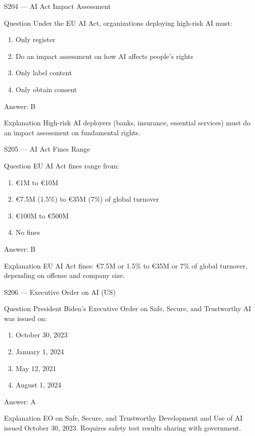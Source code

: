 \documentclass[aspectratio=169,8pt]{beamer}
\begin{document}
\begin{frame}{S204 --- AI Act Impact Assessment}
	\begin{block}{Question}
		Under the EU AI Act, organizations deploying high-risk AI must:
		\begin{enumerate}
			\item Only register
			\item Do an impact assessment on how AI affects people's rights
			\item Only label content
			\item Only obtain consent
		\end{enumerate}
	\end{block}
	\begin{exampleblock}{Answer: B}\end{exampleblock}
	\begin{block}{Explanation}
		High-risk AI deployers (banks, insurance, essential services) must do an impact assessment on fundamental rights.
	\end{block}
\end{frame}

\begin{frame}{S205 --- AI Act Fines Range}
	\begin{block}{Question}
		EU AI Act fines range from:
		\begin{enumerate}
			\item €1M to €10M
			\item €7.5M (1.5\%) to €35M (7\%) of global turnover
			\item €100M to €500M
			\item No fines
		\end{enumerate}
	\end{block}
	\begin{exampleblock}{Answer: B}\end{exampleblock}
	\begin{block}{Explanation}
		EU AI Act fines: €7.5M or 1.5\% to €35M or 7\% of global turnover, depending on offense and company size.
	\end{block}
\end{frame}

\begin{frame}{S206 --- Executive Order on AI (US)}
	\begin{block}{Question}
		President Biden's Executive Order on Safe, Secure, and Trustworthy AI was issued on:
		\begin{enumerate}
			\item October 30, 2023
			\item January 1, 2024
			\item May 12, 2021
			\item August 1, 2024
		\end{enumerate}
	\end{block}
	\begin{exampleblock}{Answer: A}\end{exampleblock}
	\begin{block}{Explanation}
		EO on Safe, Secure, and Trustworthy Development and Use of AI issued October 30, 2023. Requires safety test results sharing with government.
	\end{block}
\end{frame}
\end{document}
